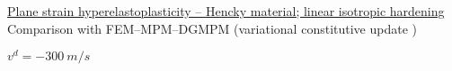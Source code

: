
%       


\begin{frame}{\href{section4/animation/hyperelastoplasticity/video.mp4}{Plane strain hyperelastoplasticity -- Hencky material; linear isotropic hardening}}
  \footnotesize Comparison with FEM--MPM--DGMPM (variational constitutive update \cite{LaurentVariational})
  \begin{overprint}
    \vspace{0.25cm}
    \begin{center}
      
      \footnotesize $v^d = -300 \: m/s$
    \end{center}
    \vspace{0.cm}
    \begin{center}
    \end{center}
  \end{overprint}
\end{frame}
